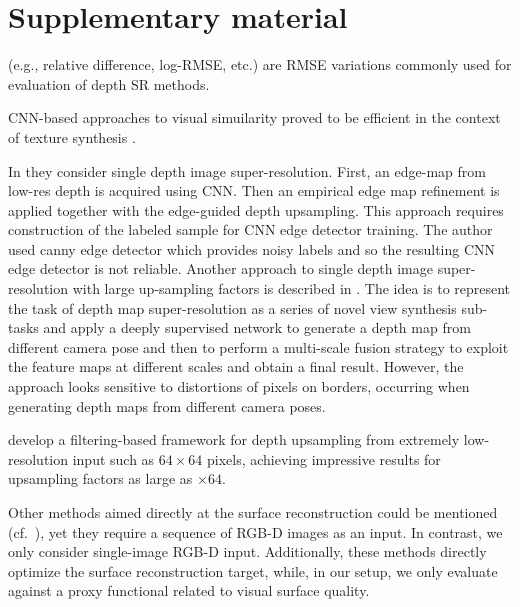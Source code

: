 
\section{Supplementary material}
\label{sec:supp}

 (e.g., relative difference, log-RMSE, etc.) are RMSE variations commonly used for evaluation of depth SR methods.
 
 
 CNN-based approaches to visual simuilarity proved to be efficient in the context of texture synthesis
\cite{gatys2015texture,lu2016learning}. 

In \cite{chen2018single} they consider single depth image super-resolution. First, an edge-map from low-res depth is acquired using CNN. Then an empirical edge map refinement is applied together with the edge-guided depth upsampling. This approach requires construction of the labeled sample for CNN edge detector training. The author used canny edge detector which provides noisy labels and so the resulting CNN edge detector is not reliable. Another approach to single depth image super-resolution with large up-sampling factors is described in \cite{song2018deeply}. The idea is to represent the task of depth map super-resolution as a series of novel view synthesis sub-tasks and apply a deeply supervised network to generate a depth map from different camera pose and then to perform a multi-scale fusion strategy to exploit the feature maps at different scales and obtain a final result. However, the approach looks sensitive  to distortions of pixels on borders, occurring when generating depth maps from different camera poses. 


\cite{lu2015sparse} develop a filtering-based framework for depth upsampling from extremely low-resolution input such as $64 \times 64$ pixels, achieving impressive results for upsampling factors as large as $\times 64$. 

Other methods aimed directly at the surface reconstruction could be mentioned (cf.~\cite{haque2017multi,maier2017intrinsic3d,zuo2017detailed}), yet they require a sequence of RGB-D images as an input. In contrast, we only consider single-image RGB-D input. Additionally, these methods directly optimize the surface reconstruction target, while, in our setup, we only evaluate against a proxy functional related to visual surface quality. 

